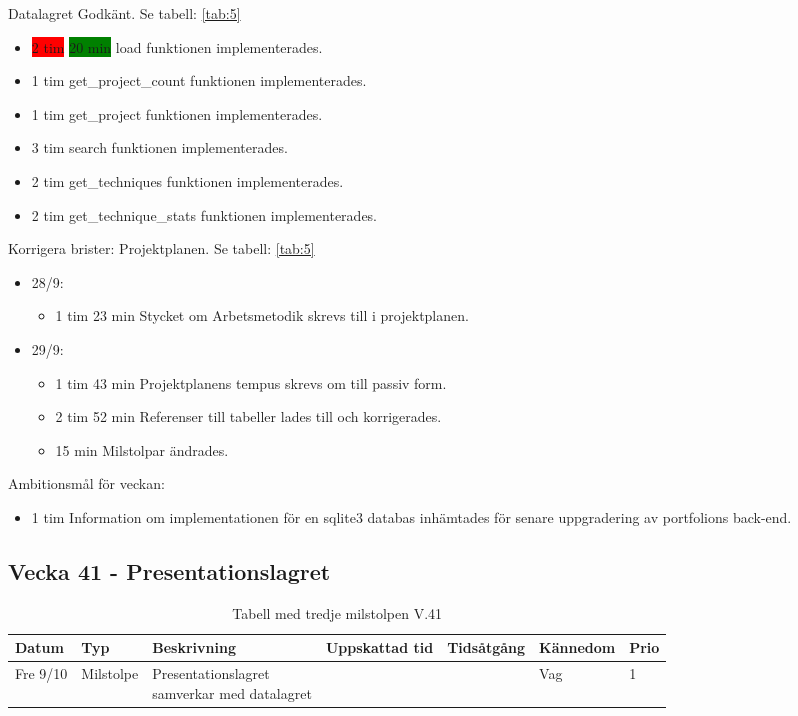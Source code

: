 \documentclass{TDP003mall}
\begin{document}
Datalagret Godkänt. Se tabell: \ref{tab:5}
\begin{itemize}
\item \colorbox{red}{2 tim} \colorbox{green}{20 min} load funktionen implementerades.
\item 1 tim get\_project\_count funktionen implementerades.
\item 1 tim get\_project funktionen implementerades.
\item 3 tim search funktionen implementerades.
\item 2 tim get\_techniques funktionen implementerades.
\item 2 tim get\_technique\_stats funktionen implementerades.
\end{itemize}

Korrigera brister: Projektplanen. Se tabell: \ref{tab:5}
\begin{itemize}
  \item 28/9:
  \begin{itemize}
  \item 1 tim 23 min Stycket om Arbetsmetodik skrevs till i projektplanen.
  \end{itemize}
  \item 29/9:
  \begin{itemize}
\item 1 tim 43 min Projektplanens tempus skrevs om till passiv form.
\item 2 tim 52 min Referenser till tabeller lades till och korrigerades.
  \item 15 min Milstolpar ändrades.
  \end{itemize}
  \end{itemize}

Ambitionsmål för veckan:
\begin{itemize}
\item 1 tim Information om implementationen för en sqlite3 databas inhämtades för senare uppgradering av portfolions back-end.
  \end{itemize}


  
  \subsection*{Vecka 41 - Presentationslagret}
  \begin{table}[h!]
          \caption{Tabell med tredje milstolpen V.41\label{tab:6}}            
  \begin{tabularx}{\linewidth}{|l|l|X|l|l|l|l|}
  \hline
  Datum          & Typ       & Beskrivning                                                  & Uppskattad tid & Tidsåtgång & Kännedom & Prio \\ [0.5ex]
  \hline                                             
        Fre 9/10 & Milstolpe & \makecell[tl]{Presentationslagret \\samverkar med datalagret} &                &            & Vag      & 1 \\
    \hline
  \end{tabularx}
        \end{table}
        
\end{document}
